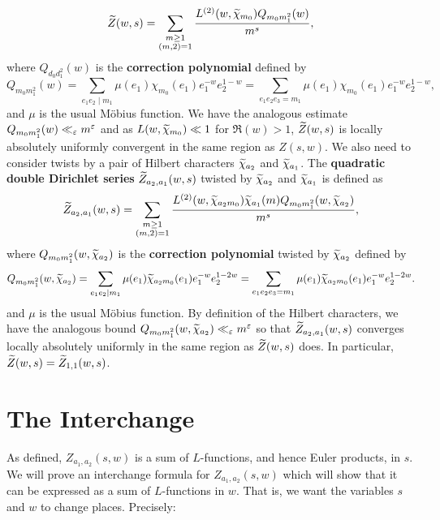 \documentclass[12pt,reqno,oneside]{amsart}
\begin{document}
    \[
        \widetilde{Z}(w,s) = \sum_{\substack{m \ge 1 \\ (m,2) = 1}}\frac{L^{(2)}(w,\widetilde{\chi}_{m_{0}})Q_{m_{0}m_{1}^{2}}(w)}{m^{s}},
    \]
    where $Q_{d_{0}d_{1}^{2}}(w)$ is the \textbf{correction polynomial} defined by
    \[
        Q_{m_{0}m_{1}^{2}}(w) = \sum_{e_{1}e_{2} \mid m_{1}}\mu(e_{1})\chi_{m_{0}}(e_{1})e_{1}^{-w}e_{2}^{1-w} = \sum_{e_{1}e_{2}e_{3} = m_{1}}\mu(e_{1})\chi_{m_{0}}(e_{1})e_{1}^{-w}e_{2}^{1-w},
    \]
    and $\mu$ is the usual M\"obius function. We have the analogous estimate $Q_{m_{0}m_{1}^{2}}(w) \ll_{\varepsilon} m^{\varepsilon}$ and as $L(w,\widetilde{\chi}_{m_{0}}) \ll 1$ for $\Re(w) > 1$, $\widetilde{Z}(w,s)$ is locally absolutely uniformly convergent in the same region as $Z(s,w)$. We also need to consider twists by a pair of Hilbert characters $\widetilde{\chi}_{a_{2}}$ and $\widetilde{\chi}_{a_{1}}$. The \textbf{quadratic double Dirichlet series} $\widetilde{Z}_{a_{2},a_{1}}(w,s)$ twisted by $\widetilde{\chi}_{a_{2}}$ and $\widetilde{\chi}_{a_{1}}$ is defined as
    \[
        \widetilde{Z}_{a_{2},a_{1}}(w,s) = \sum_{\substack{m \ge 1 \\ (m,2) = 1}}\frac{L^{(2)}(w,\widetilde{\chi}_{a_{2}m_{0}})\widetilde{\chi}_{a_{1}}(m)Q_{m_{0}m_{1}^{2}}(w,\widetilde{\chi}_{a_{2}})}{m^{s}},
    \]
    where $Q_{m_{0}m_{1}^{2}}(w,\widetilde{\chi}_{a_{2}})$ is the \textbf{correction polynomial} twisted by $\widetilde{\chi}_{a_{2}}$ defined by
    \[
        Q_{m_{0}m_{1}^{2}}(w,\widetilde{\chi}_{a_{2}}) = \sum_{e_{1}e_{2} \mid m_{1}}\mu(e_{1})\widetilde{\chi}_{a_{2}m_{0}}(e_{1})e_{1}^{-w}e_{2}^{1-2w} = \sum_{e_{1}e_{2}e_{3} = m_{1}}\mu(e_{1})\widetilde{\chi}_{a_{2}m_{0}}(e_{1})e_{1}^{-w}e_{2}^{1-2w}.
    \]
    and $\mu$ is the usual M\"obius function. By definition of the Hilbert characters, we have the analogous bound $Q_{m_{0}m_{1}^{2}}(w,\widetilde{\chi}_{a_{2}}) \ll_{\varepsilon} m^{\varepsilon}$ so that $\widetilde{Z}_{a_{2},a_{1}}(w,s)$ converges locally absolutely uniformly in the same region as $\widetilde{Z}(w,s)$ does. In particular, $\widetilde{Z}(w,s) = \widetilde{Z}_{1,1}(w,s)$.
\section{The Interchange}
    As defined, $Z_{a_{1},a_{2}}(s,w)$ is a sum of $L$-functions, and hence Euler products, in $s$. We will prove an interchange formula for $Z_{a_{1},a_{2}}(s,w)$ which will show that it can be expressed as a sum of $L$-functions in $w$. That is, we want the variables $s$ and $w$ to change places. Precisely:
\end{document}
